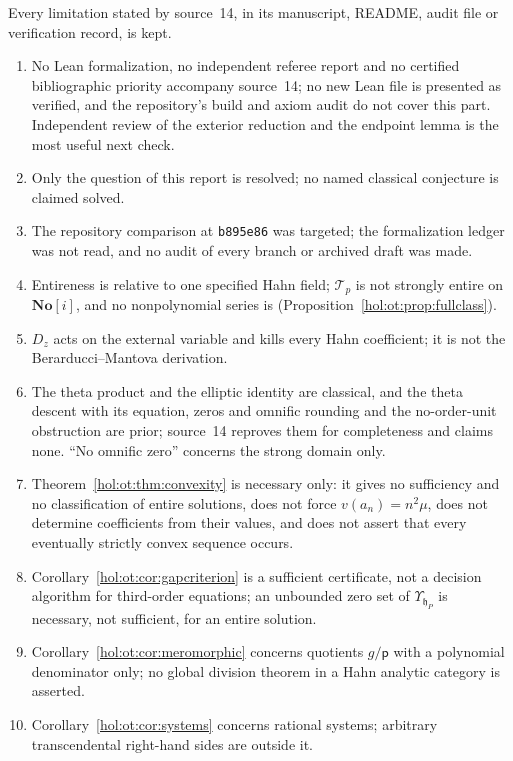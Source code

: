 \documentclass[11pt]{article}
\numberwithin{equation}{section}
\theoremstyle{definition}
\theoremstyle{remark}
\newcommand{\No}{\mathbf{No}}
\begin{document}
Every limitation stated by source~14, in its manuscript, README, audit file or
verification record, is kept.
\begin{enumerate}[label=\textup{(O\arabic*)}]
\item No Lean formalization, no independent referee report and no certified
bibliographic priority accompany source~14; no new Lean file is presented as
verified, and the repository's build and axiom audit do not cover this part.
Independent review of the exterior reduction and the endpoint lemma is the
most useful next check.
\item Only the question of this report is resolved; no named classical
conjecture is claimed solved.
\item The repository comparison at \texttt{b895e86} was targeted; the
formalization ledger was not read, and no audit of every branch or archived
draft was made.
\item Entireness is relative to one specified Hahn field; $\mathcal T_p$ is
not strongly entire on $\No[i]$, and no nonpolynomial series is
(Proposition~\ref{hol:ot:prop:fullclass}).
\item $D_z$ acts on the external variable and kills every Hahn coefficient; it
is not the Berarducci--Mantova derivation.
\item The theta product and the elliptic identity are classical, and the theta
descent with its equation, zeros and omnific rounding and the no-order-unit
obstruction are prior; source~14 reproves them for completeness and claims
none. ``No omnific zero'' concerns the strong domain only.
\item Theorem~\ref{hol:ot:thm:convexity} is necessary only: it gives no
sufficiency and no classification of entire solutions, does not force
$v(a_n)=n^2\mu$, does not determine coefficients from their values, and does
not assert that every eventually strictly convex sequence occurs.
\item Corollary~\ref{hol:ot:cor:gapcriterion} is a sufficient certificate, not
a decision algorithm for third-order equations; an unbounded zero set of
$\Upsilon_{\mathfrak h_P}$ is necessary, not sufficient, for an entire
solution.
\item Corollary~\ref{hol:ot:cor:meromorphic} concerns quotients $g/\mathsf p$ with a
polynomial denominator only; no global division theorem in a Hahn analytic
category is asserted.
\item Corollary~\ref{hol:ot:cor:systems} concerns rational systems; arbitrary
transcendental right-hand sides are outside it.

\end{enumerate}
\end{document}
